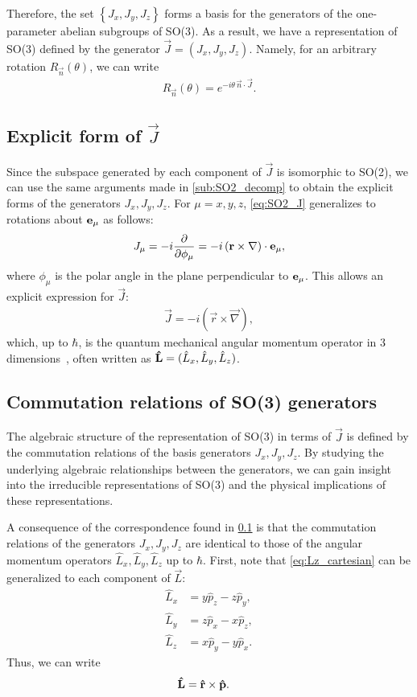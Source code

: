 Therefore, the set $\left\{ J_x,J_y,J_z \right\}$ forms a basis for the generators of the one-parameter abelian subgroups of SO(3). As a result, we have a representation of SO(3) defined by the generator $\vec{J} = (J_x,J_y,J_z)$. Namely, for an arbitrary rotation $R_{\vec{n}}(\theta)$, we can write
\begin{align*}
    R_{\vec{n}}(\theta) = e^{-i\theta\,\vec{n}\cdot\vec{J}}.
\end{align*}

\subsection{Explicit form of $\vec{J}$}\label{sec:SO3_J}
Since the subspace generated by each component of $\vec{J}$ is isomorphic to SO(2), we can use the same arguments made in \cref{sub:SO2_decomp} to obtain the explicit forms of the generators $J_x,J_y,J_z$. For $\mu=x,y,z$, \cref{eq:SO2_J} generalizes to rotations about $\mathbf{e}_\mu$ as follows:
\begin{align*}
    J_\mu = -i \frac{\partial}{\partial\phi_\mu} = -i \left( \mathbf{r}\times\mathbf{\nabla} \right)\cdot\mathbf{e}_\mu,
\end{align*}
where $\phi_\mu$ is the polar angle in the plane perpendicular to $\mathbf{e}_\mu$. This allows an explicit expression for $\vec{J}$:
\begin{align}
    \vec{J} = -i \left( \vec{r}\times\vec{\nabla} \right),
\end{align}
which, up to $\hbar$, is the quantum mechanical angular momentum operator in 3 dimensions~\cite{Hall2013}, often written as $\mathbf{\hat{L}}=(\hat{L}_x,\hat{L}_y,\hat{L}_z)$.

\subsection{Commutation relations of SO(3) generators}\label{sub:SO3_comms}
The algebraic structure of the representation of SO(3) in terms of $\vec{J}$ is defined by the commutation relations of the basis generators $J_x,J_y,J_z$. By studying the underlying algebraic relationships between the generators, we can gain insight into the irreducible representations of SO(3) and the physical implications of these representations.

A consequence of the correspondence found in \cref{sec:SO3_J} is that the commutation relations of the generators $J_x,J_y,J_z$ are identical to those of the angular momentum operators $\hat{L}_x,\hat{L}_y,\hat{L}_z$ up to $\hbar$. First, note that \cref{eq:Lz_cartesian} can be generalized to each component of $\vec{L}$:
\begin{align}
    \hat{L}_x &= y \hat{p}_z - z \hat{p}_y, \\
    \hat{L}_y &= z \hat{p}_x - x \hat{p}_z, \\
    \hat{L}_z &= x \hat{p}_y - y \hat{p}_x.
\end{align}
Thus, we can write
\begin{align}
    \mathbf{\hat{L}} &= \mathbf{\hat{r}}\times\mathbf{\hat{p}}.
\end{align}

